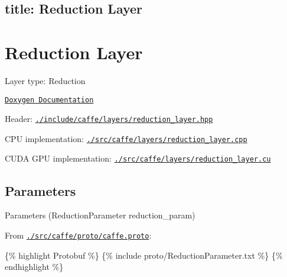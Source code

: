 

 \subsection*{title\+: Reduction Layer }

\section*{Reduction Layer}


\begin{DoxyItemize}
\item Layer type\+: {\ttfamily Reduction}
\item \href{http://caffe.berkeleyvision.org/doxygen/classcaffe_1_1ReductionLayer.html}{\tt Doxygen Documentation}
\item Header\+: \href{https://github.com/BVLC/caffe/blob/master/include/caffe/layers/reduction_layer.hpp}{\tt {\ttfamily ./include/caffe/layers/reduction\+\_\+layer.hpp}}
\item C\+PU implementation\+: \href{https://github.com/BVLC/caffe/blob/master/src/caffe/layers/reduction_layer.cpp}{\tt {\ttfamily ./src/caffe/layers/reduction\+\_\+layer.cpp}}
\item C\+U\+DA G\+PU implementation\+: \href{https://github.com/BVLC/caffe/blob/master/src/caffe/layers/reduction_layer.cu}{\tt {\ttfamily ./src/caffe/layers/reduction\+\_\+layer.cu}}
\end{DoxyItemize}

\subsection*{Parameters}


\begin{DoxyItemize}
\item Parameters ({\ttfamily Reduction\+Parameter reduction\+\_\+param})
\item From \href{https://github.com/BVLC/caffe/blob/master/src/caffe/proto/caffe.proto}{\tt {\ttfamily ./src/caffe/proto/caffe.proto}}\+:
\end{DoxyItemize}

\{\% highlight Protobuf \%\} \{\% include proto/\+Reduction\+Parameter.\+txt \%\} \{\% endhighlight \%\} 